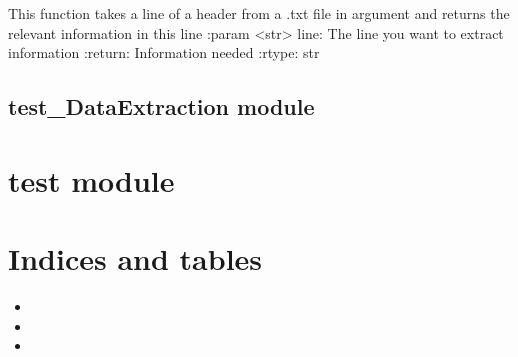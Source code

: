 \documentclass[letterpaper,10pt,english]{sphinxmanual}
\begin{document}
\begin{fulllineitems}
\label{\detokenize{split_data:split_data.spliter}}
\pysigstartsignatures
{}
\pysigstopsignatures
\sphinxAtStartPar
This function takes a line of a header from a .txt file in argument and returns the relevant information in this line
:param \textless{}str\textgreater{} line: The line you want to extract information
:return: Information needed
:rtype: str

\end{fulllineitems}


\sphinxstepscope


\section{test\_DataExtraction module}
\label{\detokenize{test_DataExtraction:module-test_DataExtraction}}\label{\detokenize{test_DataExtraction:test-dataextraction-module}}\label{\detokenize{test_DataExtraction::doc}}

\begin{fulllineitems}
\label{\detokenize{test_DataExtraction:test_DataExtraction.test_filter}}
\pysigstartsignatures
{}
\pysigstopsignatures
\end{fulllineitems}


\sphinxstepscope


\chapter{test module}
\label{\detokenize{test:module-test}}\label{\detokenize{test:test-module}}\label{\detokenize{test::doc}}

\chapter{Indices and tables}
\label{\detokenize{index:indices-and-tables}}\begin{itemize}
\item {} 
\sphinxAtStartPar
{}

\item {} 
\sphinxAtStartPar
{}

\item {} 
\sphinxAtStartPar
{}

\end{itemize}
\end{document}

